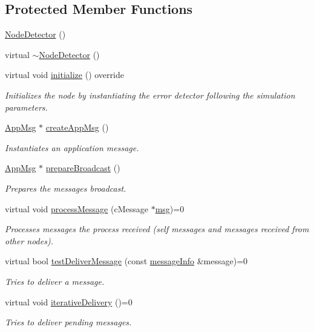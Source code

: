 \subsection*{Protected Member Functions}
\begin{DoxyCompactItemize}
\item 
\hyperlink{class_node_detector_a256160d034631f4fa14a83787f504aae}{Node\+Detector} ()
\item 
virtual \hyperlink{class_node_detector_a3f8e6eedfce05ea8953ff1a41413ccfa}{$\sim$\+Node\+Detector} ()
\item 
virtual void \hyperlink{class_node_detector_aefa188ab0657837b1b57f24674d3ef22}{initialize} () override
\begin{DoxyCompactList}\small\item\em Initializes the node by instantiating the error detector following the simulation parameters. \end{DoxyCompactList}\item 
\hyperlink{class_app_msg}{App\+Msg} $\ast$ \hyperlink{class_node_detector_a7100349647350ad5e3aeb1ed4669c723}{create\+App\+Msg} ()
\begin{DoxyCompactList}\small\item\em Instantiates an application message. \end{DoxyCompactList}\item 
\hyperlink{class_app_msg}{App\+Msg} $\ast$ \hyperlink{class_node_detector_af75cf37cc01fc51bc228a7a83c10cb97}{prepare\+Broadcast} ()
\begin{DoxyCompactList}\small\item\em Prepares the message\textquotesingle{}s broadcast. \end{DoxyCompactList}\item 
virtual void \hyperlink{class_node_detector_ab69432c6d3327a684845ec231826727e}{process\+Message} (c\+Message $\ast$\hyperlink{_controller_8h_afa0f3b802fbc219228f7bb97996fa558}{msg})=0
\begin{DoxyCompactList}\small\item\em Processes messages the process received (self messages and messages received from other nodes). \end{DoxyCompactList}\item 
virtual bool \hyperlink{class_node_detector_a51e7dccd54e94bbe937752ca39dfdba4}{test\+Deliver\+Message} (const \hyperlink{structures_8h_a7e7bdc1d2fff8a9436f2f352b2711ed6}{message\+Info} \&message)=0
\begin{DoxyCompactList}\small\item\em Tries to deliver a message. \end{DoxyCompactList}\item 
virtual void \hyperlink{class_node_detector_a17ecf9939fce7471f4513b66185743cc}{iterative\+Delivery} ()=0
\begin{DoxyCompactList}\small\item\em Tries to deliver pending messages. \end{DoxyCompactList}\end{DoxyCompactItemize}

